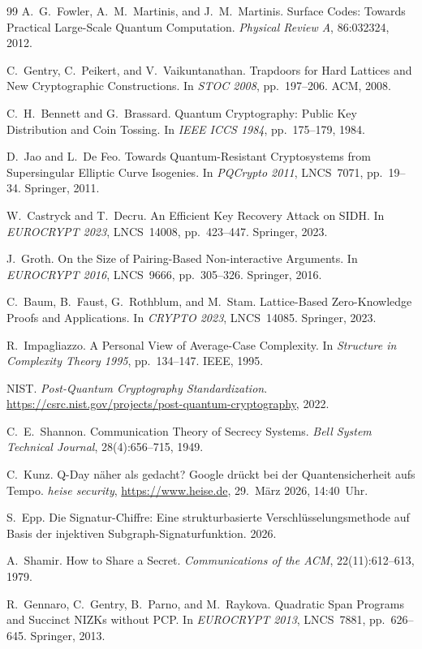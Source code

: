 ﻿\documentclass[a4paper,12pt]{article}
\theoremstyle{definition}
\begin{document}
\begin{thebibliography}{99}
A.\ G.\ Fowler, A.\ M.\ Martinis, and J.\ M.\ Martinis. Surface Codes: Towards Practical Large-Scale Quantum Computation. \textit{Physical Review A}, 86:032324, 2012.

C.\ Gentry, C.\ Peikert, and V.\ Vaikuntanathan. Trapdoors for Hard Lattices and New Cryptographic Constructions. In \textit{STOC 2008}, pp.~197--206. ACM, 2008.

C.\ H.\ Bennett and G.\ Brassard. Quantum Cryptography: Public Key Distribution and Coin Tossing. In \textit{IEEE ICCS 1984}, pp.~175--179, 1984.

D.\ Jao and L.\ De Feo. Towards Quantum-Resistant Cryptosystems from Supersingular Elliptic Curve Isogenies. In \textit{PQCrypto 2011}, LNCS~7071, pp.~19--34. Springer, 2011.

W.\ Castryck and T.\ Decru. An Efficient Key Recovery Attack on SIDH. In \textit{EUROCRYPT 2023}, LNCS~14008, pp.~423--447. Springer, 2023.

J.\ Groth. On the Size of Pairing-Based Non-interactive Arguments. In \textit{EUROCRYPT 2016}, LNCS~9666, pp.~305--326. Springer, 2016.

C.\ Baum, B.\ Faust, G.\ Rothblum, and M.\ Stam. Lattice-Based Zero-Knowledge Proofs and Applications. In \textit{CRYPTO 2023}, LNCS~14085. Springer, 2023.

R.\ Impagliazzo. A Personal View of Average-Case Complexity. In \textit{Structure in Complexity Theory 1995}, pp.~134--147. IEEE, 1995.

NIST. \textit{Post-Quantum Cryptography Standardization}. \url{https://csrc.nist.gov/projects/post-quantum-cryptography}, 2022.

C.\ E.\ Shannon. Communication Theory of Secrecy Systems. \textit{Bell System Technical Journal}, 28(4):656--715, 1949.

C.\ Kunz. Q-Day n\"aher als gedacht? Google dr\"uckt bei der Quantensicherheit aufs Tempo. \textit{heise security}, \url{https://www.heise.de}, 29.\ M\"arz 2026, 14:40~Uhr.

S.\ Epp. Die Signatur-Chiffre: Eine strukturbasierte Verschl\"usselungsmethode auf Basis der injektiven Subgraph-Signaturfunktion. 2026.

A.\ Shamir. How to Share a Secret. \textit{Communications of the ACM}, 22(11):612--613, 1979.

R.\ Gennaro, C.\ Gentry, B.\ Parno, and M.\ Raykova. Quadratic Span Programs and Succinct NIZKs without PCP. In \textit{EUROCRYPT 2013}, LNCS~7881, pp.~626--645. Springer, 2013.

\end{thebibliography}
\end{document}
